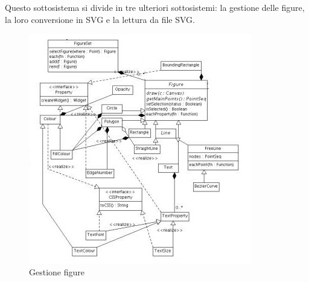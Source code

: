 Questo sottosistema si divide in tre ulteriori sottosistemi: la gestione delle
figure, la loro conversione in SVG e la lettura da file SVG.

\begin{figure}[!ht]
\centering
\includegraphics{gestionefigure.jpg}
\caption{Gestione figure}
\end{figure}
